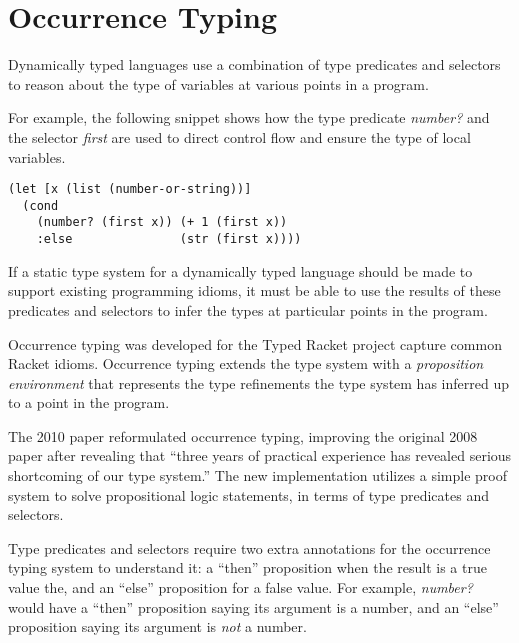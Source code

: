 \documentclass[12pt, a4paper]{article}
\begin{document}
\section{Occurrence Typing}
\label{sec:OccurrenceTyping}

Dynamically typed languages use a combination of type predicates and
selectors to reason about the type of variables at various points in a program.

For example, the following snippet shows how the type predicate
\emph{number?} and the selector \emph{first} are used to direct control flow and ensure the 
type of local variables.

\newpage

\begin{Verbatim}[frame=single]
(let [x (list (number-or-string))]
  (cond 
    (number? (first x)) (+ 1 (first x))
    :else               (str (first x))))
\end{Verbatim}

If a static type system for a dynamically typed language 
should be made to support existing programming idioms, it must
be able to use the results of these predicates and selectors to
infer the types at particular points in the program.

Occurrence typing \cite{Tobin-Hochstadt:2008:DIT:1328897.1328486}
\cite{Tobin-Hochstadt:2010:LTU:1932681.1863561}
was developed for the Typed Racket project capture common Racket idioms.
Occurrence typing extends the type system with a \emph{proposition environment}
that represents the type refinements the type system has inferred
up to a point in the program.

The 2010 paper \cite{Tobin-Hochstadt:2010:LTU:1932681.1863561}
reformulated occurrence typing, improving the original 2008 paper
\cite{Tobin-Hochstadt:2008:DIT:1328897.1328486}
after revealing that ``three years of practical experience has revealed
serious shortcoming of our type system.'' \cite{Tobin-Hochstadt:2010:LTU:1932681.1863561}
The new implementation utilizes a simple proof system to solve
propositional logic statements, in terms of type predicates and selectors.

Type predicates and selectors require two extra annotations 
for the occurrence typing system to understand it: a ``then'' proposition
when the result is a true value the, and an ``else'' proposition for a false value.
For example, \emph{number?} would have a ``then'' proposition saying its argument
is a number, and an ``else'' proposition saying its argument is \emph{not} a number.
\end{document}
